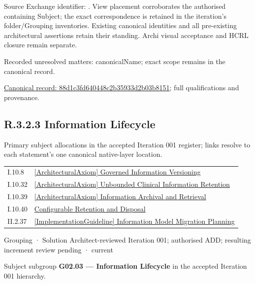 Source Exchange identifier: \texttt{}. View placement corroborates
the authorised containing Subject; the exact correspondence is retained in the
iteration's folder/Grouping inventories. Existing canonical identities and all
pre-existing architectural assertions retain their standing. Archi visual
acceptance and HCRL closure remain separate.


{\small Recorded unresolved matters: canonicalName; exact scope remains in the canonical record.}\par
{\footnotesize \href{../../../../continuum/grouping/88d1c3fd640448c2b35933d2b03b8151.md}{Canonical record: 88d1c3fd640448c2b35933d2b03b8151}; full qualifications and provenance.}\par
\subsection*{R.3.2.3 Information Lifecycle}
\label{navigation:R.3.2.3}

Primary subject allocations in the accepted Iteration 001 register; links resolve to each statement’s one canonical native-layer location.\par
\begin{longtable}{p{.22\linewidth}p{.73\linewidth}}
I.10.8 & \hyperref[element:2bd0132f072b42e9bf71bf483eb2deec]{[ArchitecturalAxiom] Governed Information Versioning} \\
I.10.32 & \hyperref[element:4c270732fecf4e79bb83c938861ce05b]{[ArchitecturalAxiom] Unbounded Clinical Information Retention} \\
I.10.39 & \hyperref[element:2429db4dbecc4a03a66f5189d76a6c38]{[ArchitecturalAxiom] Information Archival and Retrieval} \\
I.10.40 & \hyperref[element:b1a46fce85b4448fba55987af146d61e]{Configurable Retention and Disposal} \\
II.2.37 & \hyperref[element:4a2cd91fab0c42e98b09a017aefa66de]{[ImplementationGuideline] Information Model Migration Planning} \\
\end{longtable}
\label{element:b23f7fa8cb1b46569f63bde1aa5fbf1f}
{\small Grouping · Solution Architect-reviewed Iteration 001; authorised ADD; resulting increment review pending · current}\par

Subject subgroup \textbf{G02.03 — Information Lifecycle} in the accepted Iteration 001 hierarchy.



